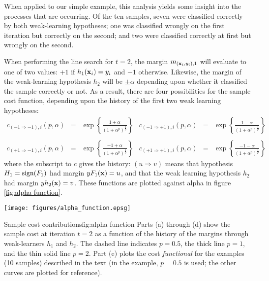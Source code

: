 When applied to our simple example, this analysis yields some
insight into the processes that are occurring.  Of the ten samples,
seven were classified correctly by both weak-learning hypotheses; one
was classified wrongly on the first iteration but correctly on the
second; and two were classified correctly at first but wrongly on the
second.

When performing the line search for $t=2$, the margin $m_{(\mathbf{x}_i,
y_i), 1}$ will evaluate to one of two values: $+1$ if  $h_1(\mathbf{x}_i) =
y_i$ and $-1$ otherwise.  Likewise, the margin of the weak-learning
hypothesis $h_2$ will be $\pm \alpha$ depending upon whether it
classified the sample correctly or not.  As a result, there are four
possibilities for the sample cost function, depending upon the history
of the first two weak learning hypotheses: 
%
\providecommand{\ra}{\Rightarrow}
\providecommand{\Pn}{(1 + \alpha^p)^{\frac{1}{p}}}
\begin{equation}
\begin{array}{rclrcl}
c_{(-1 \ra -1),i}(p,\alpha) & = & \exp \left\{ \frac{ 1 + \alpha}{\Pn} \right\} &
c_{(-1 \ra +1),i}(p,\alpha) & = & \exp \left\{ \frac{ 1 - \alpha}{\Pn}
\right\} \\
& & & & & \\ %
c_{(+1 \ra -1),i}(p,\alpha) & = & \exp \left\{ \frac{-1 + \alpha}{\Pn} \right\} &
c_{(+1 \ra +1),i}(p,\alpha) & = & \exp \left\{ \frac{-1 - \alpha}{\Pn} \right\}
\end{array}
\end{equation}
%
where the subscript to $c$ gives the history: $(u \ra v)$ means that
hypothesis $H_1 = \mathrm{sign}(F_1)$ had margin $yF_1(\mathbf{x}) = u$, and that
the weak learning hypothesis $h_{2}$ had margin $yh_2(\mathbf{x}) =
v$. These functions are plotted against alpha in figure \ref{fig:alpha
function}. 

\begin{linefigure}
\begin{center}
\hspace*{-0.5cm}\texttt{[image: figures/alpha\_function.epsg]}
\end{center}
\begin{capt}{Sample cost contributions}{fig:alpha function}
Parts (a) through (d) show the sample cost at iteration $t=2$ as a
function of the history of the margins through weak-learners $h_1$ and
$h_2$.  The dashed line indicates $p=0.5$, the thick line $p=1$, and
the thin solid line $p=2$.  Part (e) plots the cost \emph{functional}
for the examples (10 samples) described in the text (in the example,
$p=0.5$ is used; the other curves are plotted for reference).
\end{capt}
\end{linefigure}

